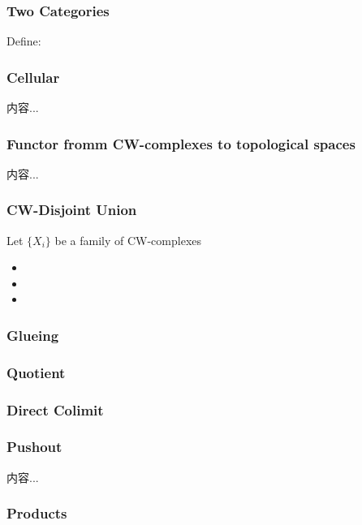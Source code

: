 \documentclass[Total.tex]{subfiles}
\begin{document}
	\subsubsection{Two Categories}
	\begin{Def}
		Define:
	\end{Def}
	\subsubsection{Cellular}
	\begin{Def}
		内容...
	\end{Def}
	\subsubsection{Functor fromm CW-complexes to topological spaces}
	\begin{lemma}
		内容...
	\end{lemma}
	\subsubsection{CW-Disjoint Union}
	\begin{proposition}
		Let $\{X_i\}$ be a family of CW-complexes
		\begin{itemize}
			\item 
			\item 
			\item 
		\end{itemize}
	\end{proposition}
	\subsubsection{Glueing}
	\subsubsection{Quotient}
	\subsubsection{Direct Colimit}
	\subsubsection{Pushout}
	\begin{Def}
		内容...
	\end{Def}
	\subsubsection{Products}
\end{document}
